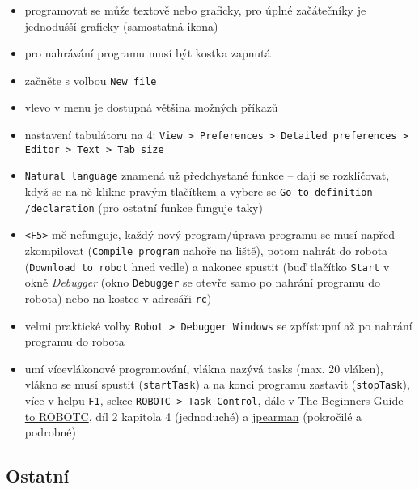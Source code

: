 \documentclass[12pt]{article}
\begin{document}
\begin{itemize}
	\item programovat se může textově nebo graficky, pro úplné začátečníky je jednodušší graficky (samostatná ikona)
	\item pro nahrávání programu musí být kostka zapnutá
	\item začněte s volbou \texttt{New file}
	\item vlevo v menu je dostupná většina možných příkazů
	\item nastavení tabulátoru na 4: 
	\texttt{View > Preferences > Detailed preferences > Editor > Text > Tab size}
	\item \texttt{Natural language} znamená už předchystané funkce -- dají se rozklíčovat, když se na ně klikne pravým tlačítkem a vybere se \texttt{Go to definition /declaration} (pro ostatní funkce funguje taky) 
	\item \texttt{<F5>} mě nefunguje, každý nový program/úprava programu se musí napřed zkompilovat (\texttt{Compile program} nahoře na liště), potom nahrát do robota (\texttt{Download to robot} hned vedle) a nakonec spustit (buď tlačítko \texttt{Start} v okně \textit{Debugger} (okno \texttt{Debugger} se otevře samo po nahrání programu do robota)  nebo na kostce v adresáři \texttt{rc})
	\item velmi praktické volby \texttt{Robot > Debugger Windows} se zpřístupní až po nahrání programu do robota
	
	\item umí vícevlákonové programování, vlákna nazývá tasks (max. 20 vláken), vlákno se musí spustit (\texttt{startTask}) a na konci programu zastavit (\texttt{stopTask}), více v helpu \texttt{F1}, sekce \texttt{ROBOTC > Task Control}, dále v 
	\href{http://georgegillard.com/documents/1-the-beginners-guide-to-robotc}{The Beginners Guide to ROBOTC}, díl 2 kapitola 4 (jednoduché) a 
	\href{https://www.vexforum.com/t/discussion-on-using-tasks-in-robotc/33025}{jpearman} (pokročilé a podrobné)
	
	
\end{itemize}
  
  
\subsection{Ostatní}
\end{document}
